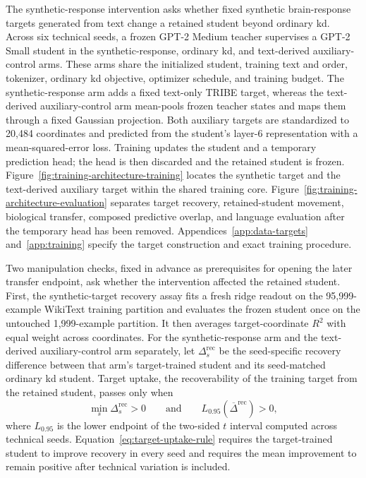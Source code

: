 The synthetic-response intervention asks whether fixed synthetic brain-response targets generated from text change a retained student beyond ordinary \ac{kd}.
Across six technical seeds, a frozen GPT-2 Medium teacher supervises a GPT-2 Small student in the synthetic-response, ordinary \ac{kd}, and text-derived auxiliary-control arms.
These arms share the initialized student, training text and order, tokenizer, ordinary \ac{kd} objective, optimizer schedule, and training budget.
The synthetic-response arm adds a fixed text-only TRIBE target, whereas the text-derived auxiliary-control arm mean-pools frozen teacher states and maps them through a fixed Gaussian projection.
Both auxiliary targets are standardized to 20,484 coordinates and predicted from the student's layer-6 representation with a mean-squared-error loss.
Training updates the student and a temporary prediction head; the head is then discarded and the retained student is frozen.
Figure~\ref{fig:training-architecture-training} locates the synthetic target and the text-derived auxiliary target within the shared training core.
Figure~\ref{fig:training-architecture-evaluation} separates target recovery, retained-student movement, biological transfer, composed predictive overlap, and language evaluation after the temporary head has been removed.
Appendices~\ref{app:data-targets} and~\ref{app:training} specify the target construction and exact training procedure.

Two manipulation checks, fixed in advance as prerequisites for opening the later transfer endpoint, ask whether the intervention affected the retained student.
First, the synthetic-target recovery assay fits a fresh ridge readout on the 95,999-example WikiText training partition and evaluates the frozen student once on the untouched 1,999-example partition.
It then averages target-coordinate \(R^2\) with equal weight across coordinates.
For the synthetic-response arm and the text-derived auxiliary-control arm separately, let \(\Delta_s^{\mathrm{rec}}\) be the seed-specific recovery difference between that arm's target-trained student and its seed-matched ordinary \ac{kd} student.
Target uptake, the recoverability of the training target from the retained student, passes only when
\begin{equation}
\min_s \Delta_s^{\mathrm{rec}} > 0 %
\qquad\text{and}\qquad
L_{0.95}\!\left(\overline{\Delta}^{\mathrm{rec}}\right) > 0, %
\label{eq:target-uptake-rule}
\end{equation}
where \(L_{0.95}\) is the lower endpoint of the two-sided \(t\) interval computed across technical seeds.
Equation~\ref{eq:target-uptake-rule} requires the target-trained student to improve recovery in every seed and requires the mean improvement to remain positive after technical variation is included.

